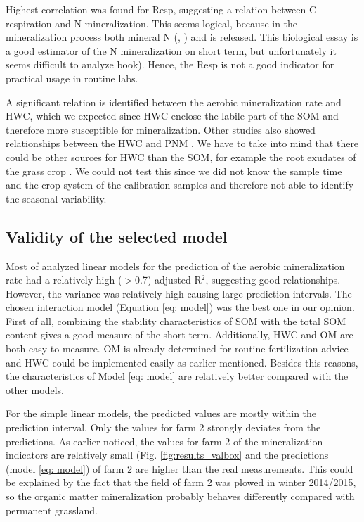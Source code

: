 \documentclass[10pt,twoside,dutch,english]{report}
\begin{document}
Highest correlation was found for Resp, suggesting a relation between C respiration and N mineralization. This seems logical, because in the mineralization process both mineral N (, ) and  is released.  This biological essay is a good estimator of the N mineralization on short term, but unfortunately it seems difficult to analyze \citep{Bloem2005} book). Hence, the Resp is not a good indicator for practical usage in routine labs.  

A significant relation is identified between the aerobic mineralization rate and HWC, which we expected since HWC enclose the labile part of the SOM \citep{Haynes2005, Hanegraaf2009} and therefore more susceptible for mineralization. Other studies also showed relationships between the HWC and PNM \citep{Ghani2003, Eekeren2010}. We have to take into mind that there could be other sources for HWC than the SOM, for example the root exudates of the grass crop \citep{Hanegraaf2009}. We could not test this since we did not know the sample time and the crop system of the calibration samples and therefore not able to identify the seasonal variability. 


   
\subsection{Validity of the selected model}
Most of analyzed linear models for the prediction of the aerobic mineralization rate had a relatively high ($>$0.7) adjusted R$^{2}$, suggesting good relationships. However, the variance was relatively high causing large prediction intervals.  
The chosen interaction model (Equation \ref{eq: model}) was the best one in our opinion. First of all, combining the stability characteristics of SOM with the total SOM content gives a good measure of the short term. Additionally,  HWC and OM are both  easy to measure.  OM is already determined for routine fertilization advice and HWC could be implemented easily as earlier mentioned.  Besides this reasons, the characteristics of Model \ref{eq: model} are relatively better compared with the other models. 

For the simple linear models, the predicted values are mostly within the prediction interval. Only the values for farm 2 strongly deviates from the predictions. As earlier noticed, the values for farm 2 of the mineralization indicators are relatively small (Fig. \ref{fig:results_valbox} and the predictions (model \ref{eq: model}) of farm 2 are higher than the real measurements. This could be explained by the fact that the field of farm 2 was plowed in winter 2014/2015, so the organic matter mineralization probably behaves differently compared with permanent grassland. 
\end{document}
